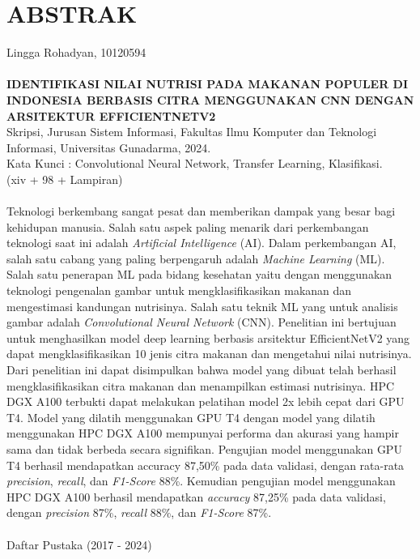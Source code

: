 \chapter*{ABSTRAK}
\begin{singlespace}
    \noindent
    Lingga Rohadyan, 10120594 \\ \\
    \textbf{IDENTIFIKASI NILAI NUTRISI PADA MAKANAN POPULER DI INDONESIA BERBASIS CITRA MENGGUNAKAN CNN DENGAN ARSITEKTUR EFFICIENTNETV2}\\
    Skripsi, Jurusan Sistem Informasi, Fakultas Ilmu Komputer dan Teknologi Informasi, Universitas Gunadarma, 2024.\\
    Kata Kunci : Convolutional Neural Network, Transfer Learning, Klasifikasi.\\
    (xiv + 98 + Lampiran) \\ \\
    Teknologi berkembang sangat pesat dan memberikan dampak yang besar bagi kehidupan manusia. Salah satu aspek paling menarik dari perkembangan teknologi saat ini adalah \textit{Artificial Intelligence} (AI). Dalam perkembangan AI, salah satu cabang yang paling berpengaruh adalah \textit{Machine Learning} (ML). Salah satu penerapan ML pada bidang kesehatan yaitu dengan menggunakan teknologi pengenalan gambar untuk mengklasifikasikan makanan dan mengestimasi kandungan nutrisinya. Salah satu teknik ML yang untuk analisis gambar adalah \textit{Convolutional Neural Network} (CNN).
    Penelitian ini bertujuan untuk menghasilkan model deep learning berbasis arsitektur EfficientNetV2 yang dapat mengklasifikasikan 10 jenis citra makanan dan mengetahui nilai nutrisinya. Dari penelitian ini dapat disimpulkan bahwa model yang dibuat telah berhasil mengklasifikasikan citra makanan dan menampilkan estimasi nutrisinya. HPC DGX A100 terbukti dapat melakukan pelatihan model 2x lebih cepat dari GPU T4. Model yang dilatih menggunakan GPU T4 dengan model yang dilatih menggunakan HPC DGX A100 mempunyai performa dan akurasi yang hampir sama dan tidak berbeda secara signifikan. Pengujian model menggunakan GPU T4 berhasil mendapatkan accuracy 87,50\% pada data validasi, dengan rata-rata \textit{precision}, \textit{recall}, dan \textit{F1-Score} 88\%. Kemudian pengujian model menggunakan HPC DGX A100 berhasil mendapatkan \textit{accuracy} 87,25\% pada data validasi, dengan \textit{precision} 87\%, \textit{recall} 88\%, dan \textit{F1-Score} 87\%. \\ \\
    Daftar Pustaka (2017 - 2024)
\end{singlespace}
\pagebreak